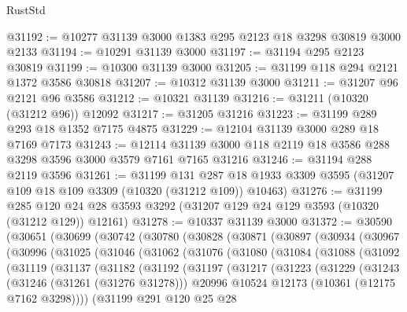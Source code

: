 \begin{lexlean}{RustStd}
\begin{coremodule}
@31192 := @10277 @31139 @3000 @1383 @295 @2123 @18 @3298 @30819 @3000 @2133
@31194 := @10291 @31139 @3000
@31197 := @31194 @295 @2123 @30819
@31199 := @10300 @31139 @3000
@31205 := @31199 @118 @294 @2121 @1372 @3586 @30818
@31207 := @10312 @31139 @3000
@31211 := @31207 @96 @2121 @96 @3586
@31212 := @10321 @31139
@31216 := @31211 (@10320 (@31212 @96)) @12092
@31217 := @31205 @31216
@31223 := @31199 @289 @293 @18 @1352 @7175 @4875
@31229 := @12104 @31139 @3000 @289 @18 @7169 @7173
@31243 := @12114 @31139 @3000 @118 @2119 @18 @3586 @288 @3298 @3596 @3000 @3579 @7161 @7165 @31216
@31246 := @31194 @288 @2119 @3596
@31261 := @31199
    @131
    @287
    @18
    @1933
    @3309
    @3595
    (@31207 @109 @18 @109 @3309 (@10320 (@31212 @109)) @10463)
@31276 := @31199
    @285
    @120
    @24
    @28
    @3593
    @3292
    (@31207 @129 @24 @129 @3593 (@10320 (@31212 @129)) @12161)
@31278 := @10337 @31139 @3000
@31372 := @30590
    (@30651
      (@30699
        (@30742
          (@30780
            (@30828
              (@30871
                (@30897
                  (@30934
                    (@30967
                      (@30996
                        (@31025
                          (@31046
                            (@31062
                              (@31076
                                (@31080
                                  (@31084
                                    (@31088
                                      (@31092
                                        (@31119
                                          (@31137
                                            (@31182
                                              (@31192
                                                (@31197
                                                  (@31217
                                                    (@31223
                                                      (@31229
                                                        (@31243
                                                          (@31246 (@31261 (@31276 @31278)))
                                                          @20996
                                                          @10524
                                                          @12173
                                                          (@10361 (@12175 @7162 @3298))))
                                                      (@31199
                                                        @291
                                                        @120
                                                        @25
                                                        @28

\end{coremodule}
\end{lexlean}

